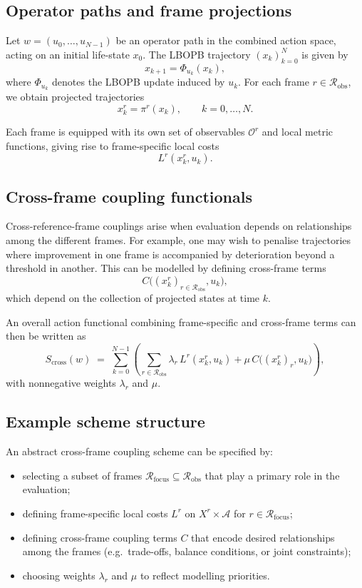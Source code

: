 \documentclass[11pt]{book}
\theoremstyle{plain}
\theoremstyle{definition}
\theoremstyle{remark}
\begin{document}
\subsection*{Operator paths and frame projections}

Let $w = (u_{0},\dots,u_{N-1})$ be an operator path in the combined
action space, acting on an initial life-state $x_{0}$. The LBOPB
trajectory $(x_{k})_{k=0}^{N}$ is given by
\[
  x_{k+1} = \Phi_{u_{k}}(x_{k}),
\]
where $\Phi_{u_{k}}$ denotes the LBOPB update induced by $u_{k}$. For
each frame $r \in \mathcal{R}_{\mathrm{obs}}$, we obtain projected
trajectories
\[
  x^{r}_{k} = \pi^{r}(x_{k}),
  \qquad k = 0,\dots,N.
\]

Each frame is equipped with its own set of observables
$\mathcal{O}^{r}$ and local metric functions, giving rise to
frame-specific local costs
\[
  L^{r}(x^{r}_{k}, u_{k}).
\]

\subsection*{Cross-frame coupling functionals}

Cross-reference-frame couplings arise when evaluation depends on
relationships among the different frames. For example, one may wish
to penalise trajectories where improvement in one frame is accompanied
by deterioration beyond a threshold in another. This can be modelled
by defining cross-frame terms
\[
  C\bigl( (x^{r}_{k})_{r \in \mathcal{R}_{\mathrm{obs}}}, u_{k} \bigr),
\]
which depend on the collection of projected states at time $k$.

An overall action functional combining frame-specific and cross-frame
terms can then be written as
\[
  S_{\mathrm{cross}}(w)
  \;=\;
  \sum_{k=0}^{N-1}
  \left(
    \sum_{r \in \mathcal{R}_{\mathrm{obs}}}
    \lambda_{r}\, L^{r}(x^{r}_{k}, u_{k})
    +
    \mu\, C\bigl( (x^{r}_{k})_{r}, u_{k} \bigr)
  \right),
\]
with nonnegative weights $\lambda_{r}$ and $\mu$.

\subsection*{Example scheme structure}

An abstract cross-frame coupling scheme can be specified by:

\begin{itemize}
  \item selecting a subset of frames
        $\mathcal{R}_{\mathrm{focus}} \subseteq \mathcal{R}_{\mathrm{obs}}$
        that play a primary role in the evaluation;
  \item defining frame-specific local costs $L^{r}$ on
        $X^{r} \times \mathcal{A}$ for $r \in \mathcal{R}_{\mathrm{focus}}$;
  \item defining cross-frame coupling terms $C$ that encode desired
        relationships among the frames (e.g.\ trade-offs, balance
        conditions, or joint constraints);
  \item choosing weights $\lambda_{r}$ and $\mu$ to reflect modelling
        priorities.
\end{itemize}
\end{document}
